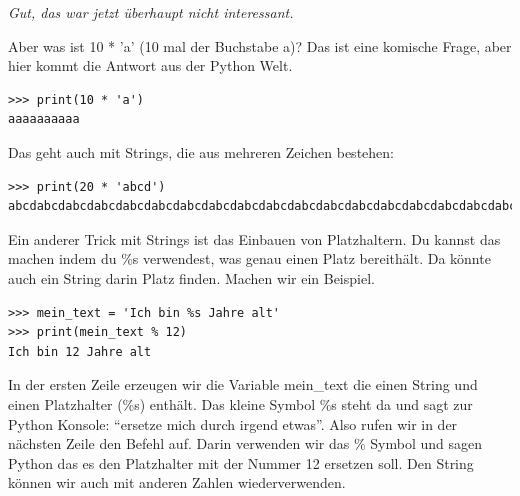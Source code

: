 \noindent
\emph{Gut, das war jetzt überhaupt nicht interessant.}

Aber was ist 10 * 'a' (10 mal der Buchstabe a)? Das ist eine komische Frage, aber hier kommt die Antwort aus der Python Welt.

\begin{Verbatim}[frame=single]
>>> print(10 * 'a')
aaaaaaaaaa
\end{Verbatim}

Das geht auch mit Strings, die aus mehreren Zeichen bestehen:

\begin{Verbatim}[frame=single]
>>> print(20 * 'abcd')
abcdabcdabcdabcdabcdabcdabcdabcdabcdabcdabcdabcdabcdabcdabcdabcdabcdabcdabcdabcd
\end{Verbatim}

Ein anderer Trick mit Strings ist das Einbauen von Platzhaltern. Du kannst das machen indem du \%s verwendest, was genau einen Platz bereithält. Da könnte auch ein String darin Platz finden. Machen wir ein Beispiel.

\begin{Verbatim}[frame=single]
>>> mein_text = 'Ich bin %s Jahre alt'
>>> print(mein_text % 12)
Ich bin 12 Jahre alt
\end{Verbatim}

In der ersten Zeile erzeugen wir die Variable mein\_text die einen String und einen Platzhalter (\%s) enthält. Das kleine Symbol \%s steht da und sagt zur Python Konsole: ``ersetze mich durch irgend etwas''. Also rufen wir in der nächsten Zeile den  Befehl auf. Darin verwenden wir das \% Symbol und sagen Python das es den Platzhalter mit der Nummer 12 ersetzen soll. Den String können wir auch mit anderen Zahlen wiederverwenden.

